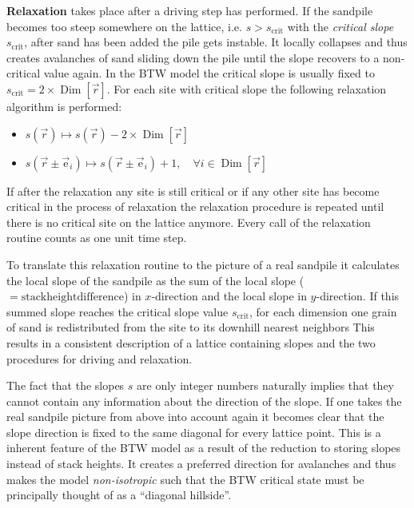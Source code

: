 \textbf{Relaxation} takes place after a driving step has performed. If the sandpile becomes too steep somewhere on the
lattice, i.e. $s > s_{\mathrm{crit}}$ with the \emph{critical slope} $s_{\mathrm{crit}}$, after sand has been added
the pile gets instable. It locally collapses and thus creates avalanches of sand sliding down the pile until the slope
recovers to a non-critical value again. In the BTW model the critical slope is usually fixed to
$s_{\mathrm{crit}}=2\times\operatorname{Dim}\left[\vec{r}\right]$. For each site with critical slope the following
relaxation algorithm is performed:
\begin{itemize}
\item $s(\vec{r}) \mapsto s(\vec{r}) - 2\times\operatorname{Dim}\left[\vec{r}\right]$
\item $s(\vec{r}\pm\vec{\mathrm{e}}_i) \mapsto s(\vec{r}\pm\vec{\mathrm{e}}_i) + 1,
\quad \forall i\in\operatorname{Dim}\left[\vec{r}\right]$
\end{itemize}
If after the relaxation any site is still critical or if any other site has become critical in the process of
relaxation the relaxation procedure is repeated until there is no critical site on the lattice anymore.
Every call of the relaxation routine counts as one unit time step.

To translate this relaxation routine to the picture of a real sandpile it calculates the local slope of the sandpile as
the sum of the local slope ($=\mathrm{stack height difference}$) in $x$-direction and the local slope in $y$-direction.
If this summed slope reaches the critical slope value $s_{\mathrm{crit}}$, for each dimension one grain of sand is
redistributed from the site to its downhill nearest neighbors This results in a consistent description of a lattice
containing slopes and the two procedures for driving and relaxation.

The fact that the slopes $s$ are only integer numbers naturally implies that they cannot contain any information about
the direction of the slope. If one takes the real sandpile picture from above into account again it becomes clear that
the slope direction is fixed to the same diagonal for every lattice point. This is a inherent feature of the BTW model
as a result of the reduction to storing slopes instead of stack heights. It creates a preferred direction for avalanches
and thus makes the model \emph{non-isotropic} such that the BTW critical state must be principally thought of as a
\enquote{diagonal hillside}.

